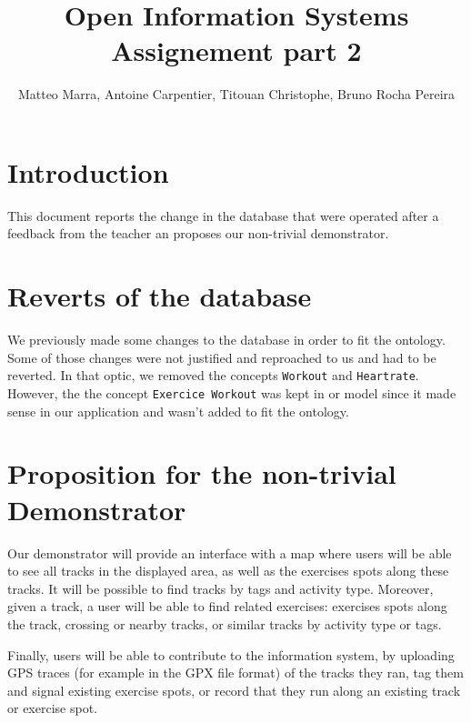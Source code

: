 \documentclass[a4paper]{article}
\title{Open Information Systems\\Assignement part 2 }
\author{Matteo Marra, Antoine Carpentier, Titouan Christophe, Bruno Rocha Pereira}
\begin{document}
\maketitle

\section{Introduction}
This document reports the change in the database that were operated after a feedback from the teacher an proposes our non-trivial demonstrator.

\section{Reverts of the database}

We previously made some changes to the database in order to fit the ontology. Some of those changes were not justified and reproached to us and had to be reverted. In that optic, we removed the concepts \texttt{Workout} and \texttt{Heartrate}. However, the the concept \texttt{Exercice Workout} was kept in or model since it made sense in our application and wasn't added to fit the ontology.

\section{Proposition for the non-trivial Demonstrator}

Our demonstrator will provide an interface with a map where users will be able to see all tracks in the displayed area, as well as the exercises spots along these tracks. It will be possible to find tracks by tags and activity type. Moreover, given a track, a user will be able to find related exercises: exercises spots along the track, crossing or nearby tracks, or similar tracks by activity type or tags.

Finally, users will be able to contribute to the information system, by uploading GPS traces (for example in the GPX file format) of the tracks they ran, tag them and signal existing exercise spots, or record that they run along an existing track or exercise spot.
\end{document}
